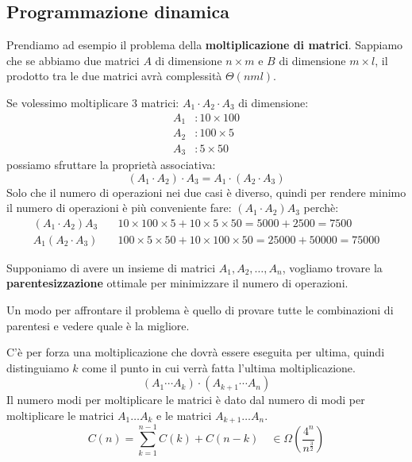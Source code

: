 \documentclass[a4paper]{article}
\begin{document}
\subsection{Programmazione dinamica}
Prendiamo ad esempio il problema della \textbf{moltiplicazione di matrici}.
Sappiamo che se abbiamo due matrici \( A \) di dimensione \( n \times m \) e \( B \)
di dimensione \( m \times l \), il prodotto tra le due matrici avrà complessità
\( \Theta(nml) \).

Se volessimo moltiplicare 3 matrici: \( A_1 \cdot A_2 \cdot A_3 \) di dimensione:
\[
\begin{aligned}
  A_1 & : 10 \times 100\\
  A_2 & : 100 \times 5\\
  A_3 & : 5 \times 50
\end{aligned}
\] 
possiamo sfruttare la proprietà associativa:
\[
  (A_1 \cdot A_2) \cdot A_3 = A_1 \cdot (A_2 \cdot A_3)
\] 
Solo che il numero di operazioni nei due casi è diverso, quindi per rendere minimo
il numero di operazioni è più conveniente fare: \( (A_1 \cdot A_2) A_3 \) perchè:
\[
\begin{aligned}
  (A_1 \cdot A_2) A_3 &\quad 10 \times 100 \times 5 + 10 \times 5 \times 50 = 5000 + 2500 = 7500\\
  A_1 (A_2 \cdot A_3) &\quad 100 \times 5 \times 50 + 10 \times 100 \times 50 = 25000 + 50000 = 75000
\end{aligned}
\] 

\vspace{1em}
\noindent
Supponiamo di avere un insieme di matrici \( A_1, A_2, \ldots, A_n \), vogliamo trovare
la \textbf{parentesizzazione} ottimale per minimizzare il numero di operazioni.

\vspace{1em}
\noindent
Un modo per affrontare il problema è quello di provare tutte le combinazioni
di parentesi e vedere quale è la migliore.

C'è per forza una moltiplicazione che dovrà essere eseguita per ultima, quindi
distinguiamo \( k \) come il punto in cui verrà fatta l'ultima moltiplicazione.
\[
  (A_1 \cdots A_k) \cdot (A_{k+1} \cdots A_n)
\] 
Il numero modi per moltiplicare le matrici è dato dal numero di modi per moltiplicare
le matrici \( A_1 \dots A_k \) e le matrici \( A_{k+1} \dots A_n \).
\[
  C(n) = \sum_{k=1}^{n-1} C(k) + C(n-k) \quad \in \Omega \left( \frac{4^n}{n^{\frac{3}{2}}} \right) 
\] 
\end{document}
